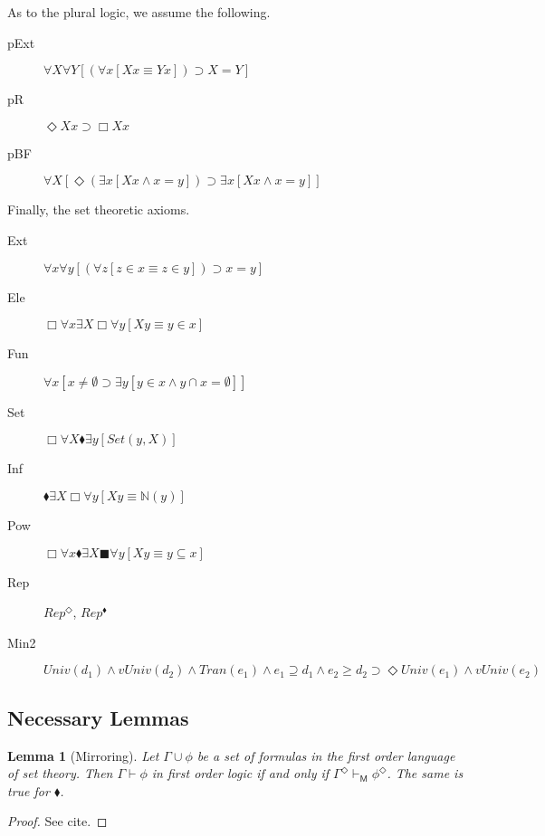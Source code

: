 \documentclass{article}
\newcommand\D{\blacklozenge}
\newcommand\B{\blacksquare}
\newtheorem{lemma}{Lemma}
\begin{document}
As to the plural logic, we assume the following.
\begin{description}
    \item[pExt] $\forall X \forall Y [(\forall x[Xx \equiv Yx]) \supset X = Y]$
    \item[pR] $ \Diamond Xx \supset \Box Xx$
    \item[pBF] $\forall X[ \Diamond (\exists x[Xx \wedge x = y]) \supset \exists x [Xx \wedge x = y]]$
\end{description}
Finally, the set theoretic axioms.
\begin{description}
    \item[Ext] $\forall x \forall y [(\forall z[z \in x \equiv z \in y]) \supset x = y]$
    \item[Ele] $\Box \forall x \exists X \Box \forall y[Xy \equiv y \in x]$
    \item[Fun] $\forall x[ x \not = \emptyset \supset \exists y[y \in x \wedge y \cap x = \emptyset]]$
    \item[Set] $\Box \forall X \D \exists y [Set(y, X)]$
    \item[Inf] $\D \exists X\Box \forall y[Xy \equiv \mathbb{N}(y)]$
    \item[Pow] $\Box \forall x \D \exists X \B \forall y [Xy \equiv y \subseteq x]$
    \item[Rep] $Rep^\Diamond$, $Rep^\D$
    \item[Min2] $Univ(d_1) \wedge vUniv(d_2) \wedge Tran(e_1) \wedge e_1 \supseteq d_1 \wedge e_2 \geq d_2 \supset \Diamond Univ(e_1)\wedge vUniv(e_2)$ 
\end{description}
\subsection{Necessary Lemmas}
\begin{lemma}[Mirroring]
    Let $\Gamma 
    \cup {\phi}$ be a set of formulas in the first order language of set theory. Then
    $\Gamma \vdash \phi$ in first order logic if and only if 
    $\Gamma^\Diamond \vdash_\mathsf{M} \phi^\Diamond$. 
    The same is true for $\blacklozenge$.
\end{lemma}
\begin{proof}
    See cite.
\end{proof}
\end{document}
